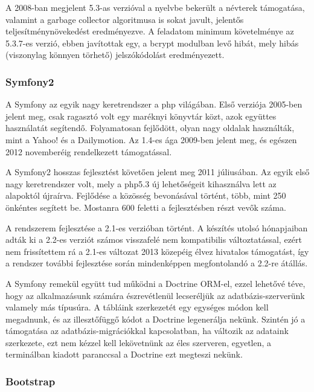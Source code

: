 \documentclass[a4paper,12pt,oneside]{report}
\begin{document}
A 2008-ban megjelent 5.3-as verzióval a nyelvbe bekerült a névterek támogatása, valamint a garbage collector algoritmusa is sokat javult, jelentős teljesítmény\-növe\-kedést eredményezve. A feladatom minimum követelménye az 5.3.7-es verzió, ebben javítottak egy, a bcrypt modulban levő hibát, mely hibás (viszonylag könnyen törhető) jelszókódolást eredményezett.

\subsubsection{Symfony2}

A Symfony az egyik nagy keretrendszer a php világában. Első verziója 2005-ben jelent meg\cite{book:gentle_introduction}, csak ragasztó volt egy maréknyi könyvtár közt, azok együttes használatát segítendő. Folyamatosan fejlődött, olyan nagy oldalak hasz\-nálták, mint a Yahoo!\cite{website:symfony_yahoo} és a Dailymotion\cite{website:symfony_dailymotion}. Az 1.4-es ága 2009-ben jelent meg, és egészen 2012 novemberéig rendelkezett támogatással.

A Symfony2 hosszas fejlesztést követően jelent meg 2011 júliusában. Az egyik első nagy keretrendszer volt, mely a php5.3 új lehetőségeit kihasználva lett az alapoktól újraírva. Fejlődése a közösség bevonásával történt, több, mint 250 önkéntes segített be. Mostanra 600 feletti a fejlesztésben részt vevők száma.

A rendszerem fejlesztése a 2.1-es verzióban történt. A készítés utolsó hónapjaiban adták ki a 2.2-es verziót számos visszafelé nem kompatibilis változtatással, ezért nem frissítettem rá \textendash{} a 2.1-es változat 2013 közepéig élvez hivatalos támogatást, így a rendszer további fejlesztése során mindenképpen megfontolandó a 2.2-re átállás.

A Symfony remekül együtt tud működni a Doctrine ORM-el\cite{website:doctrine,book:doctrine_orm}, ezzel lehetővé téve, hogy az alkalmazásunk számára észrevétlenül lecseréljük az adatbázis-szerverünk valamely más típusúra. A tábláink szerkezetét egy egységes módon kell megadnunk, és az illesztőfüggő kódot a Doctrine legenerálja nekünk. Szintén jó a támogatása az adatbázis-migrációkkal kapcsolatban, ha változik az adataink szerkezete, ezt nem kézzel kell lekövetnünk az éles szerveren, egyetlen, a terminálban kiadott paranccsal a Doctrine ezt megteszi nekünk.

\subsubsection{Bootstrap}
\end{document}
